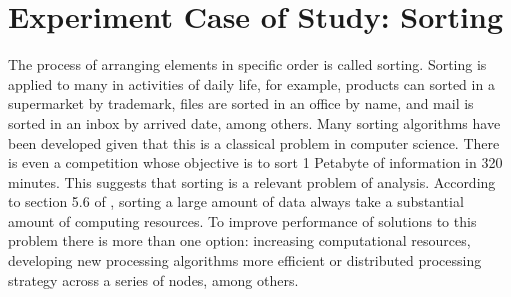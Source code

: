 \section{Experiment Case of Study: Sorting }
\label{sec:sorting}

The process of arranging elements in specific order is called sorting. Sorting is applied to many in activities of daily life, for example, products can sorted in a supermarket by trademark, files are sorted in an office by name, and mail is sorted in an inbox by arrived date, among others. Many sorting algorithms  have been developed given that this is a classical problem in computer science. There is even a competition whose objective is to sort 1 Petabyte of information in 320 minutes. This suggests that sorting is a relevant problem of analysis. According to section 5.6 of \cite {Miller:2011:PSA:2073661}, sorting a large amount of data always take a substantial amount of computing resources. To improve performance of solutions to this problem there is more than one option: increasing computational resources, developing new processing algorithms more efficient or distributed processing strategy across a series of nodes, among others.

